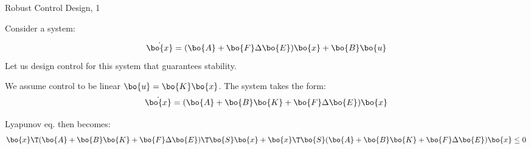 \documentclass{beamer}
\begin{document}
\begin{frame}{Robust Control Design, 1}
	\begin{flushleft}
		
		Consider a system: 
		
		\begin{equation}
			\dot{\bo{x}}  = (\bo{A} + \bo{F} \Delta \bo{E})\bo{x} + \bo{B}\bo{u}
		\end{equation}
		Let us design control for this system that guarantees stability.
		
		\bigskip
		
		We assume control to be linear $\bo{u} = \bo{K}\bo{x}$. The system takes the form:
		\begin{equation}
			\dot{\bo{x}}  = (\bo{A} + \bo{B}\bo{K} + \bo{F} \Delta \bo{E})\bo{x}
		\end{equation}
		
		Lyapunov eq. then becomes:
		\begin{equation}
			\bo{x}\T(\bo{A} + \bo{B}\bo{K} + \bo{F} \Delta \bo{E})\T\bo{S}\bo{x}
			+
			\bo{x}\T \bo{S} (\bo{A} + \bo{B}\bo{K} + \bo{F} \Delta \bo{E})\bo{x} \leq 0
		\end{equation}
		
		
		
	\end{flushleft}
\end{frame}
\end{document}
